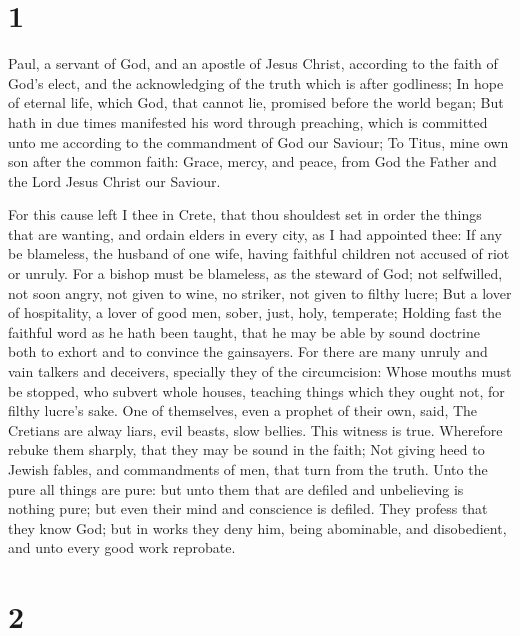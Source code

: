 \hypertarget{section}{%
\section{1}\label{section}}

 Paul, a servant of God, and an apostle of Jesus Christ,
according to the faith of God's elect, and the acknowledging of the
truth which is after godliness;  In hope of eternal life,
which God, that cannot lie, promised before the world began;
 But hath in due times manifested his word through
preaching, which is committed unto me according to the commandment of
God our Saviour;  To Titus, mine own son after the common
faith: Grace, mercy, and peace, from God the Father and the Lord Jesus
Christ our Saviour.

 For this cause left I thee in Crete, that thou shouldest
set in order the things that are wanting, and ordain elders in every
city, as I had appointed thee:  If any be blameless, the
husband of one wife, having faithful children not accused of riot or
unruly.  For a bishop must be blameless, as the steward of
God; not selfwilled, not soon angry, not given to wine, no striker, not
given to filthy lucre;  But a lover of hospitality, a
lover of good men, sober, just, holy, temperate;  Holding
fast the faithful word as he hath been taught, that he may be able by
sound doctrine both to exhort and to convince the gainsayers.
 For there are many unruly and vain talkers and
deceivers, specially they of the circumcision:  Whose
mouths must be stopped, who subvert whole houses, teaching things which
they ought not, for filthy lucre's sake.  One of
themselves, even a prophet of their own, said, The Cretians are alway
liars, evil beasts, slow bellies.  This witness is true.
Wherefore rebuke them sharply, that they may be sound in the faith;
 Not giving heed to Jewish fables, and commandments of
men, that turn from the truth.  Unto the pure all things
are pure: but unto them that are defiled and unbelieving is nothing
pure; but even their mind and conscience is defiled. 
They profess that they know God; but in works they deny him, being
abominable, and disobedient, and unto every good work reprobate.

\hypertarget{section-1}{%
\section{2}\label{section-1}}

